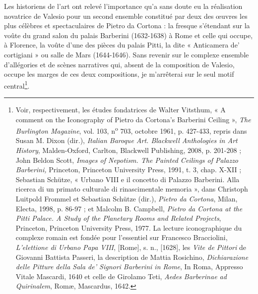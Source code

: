 \documentclass[12pt,twoside,openany]{book}
\begin{document}
Les historiens de l’art ont relevé l’importance qu’a sans doute eu la réalisation novatrice de Valesio pour un second ensemble constitué par deux des œuvres les plus célèbres et spectaculaires de Pietro da Cortona : la fresque s’étendant sur la voûte du grand salon du palais Barberini (1632-1638) à Rome et celle qui occupe, à Florence, la voûte d’une des pièces du palais Pitti, la dite « Anticamera de’ cortigiani » ou salle de Mars (1644-1646). Sans revenir sur le complexe ensemble d’allégories et de scènes narratives qui, absent de la composition de Valesio, occupe les marges de ces deux compositions, je m’arrêterai sur le seul motif central\footnote{Voir, respectivement, les études fondatrices de Walter Vitsthum, « A comment on the Iconography of Pietro da Cortona’s Barberini Ceiling », \textit{The Burlington Magazine}, vol. 103, n\textsuperscript{o} 703, octobre 1961, p. 427-433, repris dans Susan M. Dixon (dir.), \textit{Italian Baroque Art. Blackwell Anthologies in Art History}, Malden-Oxford, Carlton, Blackwell Publishing, 2008, p. 201-208 ; John Beldon Scott, \textit{Images of Nepotism. The Painted Ceilings of Palazzo Barberini,} Princeton, Princeton University Press, 1991, t. 3, chap. X-XII ; Sebastian Schütze, « Urbano VIII e il concetto di Palazzo Barberini. Alla ricerca di un primato culturale di rinascimentale memoria », dans Christoph Luitpold Frommel et Sebastian Schütze (dir.), \textit{Pietro da Cortona}, Milan, Electa, 1998, p. 86-97 ; et Malcolm B. Campbell, \textit{Pietro da Cortona at the Pitti Palace. A Study of the Planetary Rooms and Related Projects}, Princeton, Princeton University Press, 1977. La lecture iconographique du complexe romain est fondée pour l’essentiel sur Francesco Bracciolini, \textit{L’elettione di Urbano Papa VIII}, [Rome], s. n., [1628], les \textit{Vite de Pittori} de Giovanni Battista Passeri, la description de Mattia Rosichino, \textit{Dichiarazione delle Pitture della Sala de’ Signori Barberini in Rome}, In Roma, Appresso Vitale Mascardi, 1640 et celle de Girolamo Teti, \textit{Aedes Barberinae ad Quirinalem}, Romæ, Mascardus, 1642.}.
\end{document}
